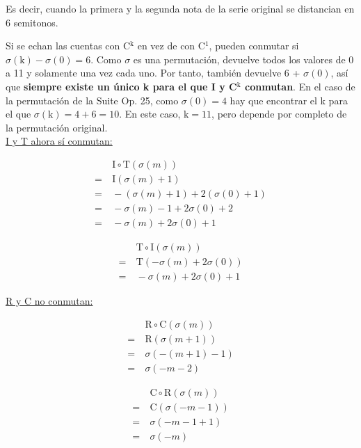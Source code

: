 		Es decir, cuando la primera y la segunda nota de la serie original se distancian en 6 semitonos.
		
		Si se echan las cuentas con C$^\text{k}$ en vez de con C$^1$, pueden conmutar si $\sigma\left(\text{k}\right)-\sigma\left(0\right)=6$. Como $\sigma$ es una permutación, devuelve todos los valores de 0 a 11 y solamente una vez cada uno. Por tanto, también devuelve 6 + $\sigma(0)$, así que \textbf{siempre existe un único k para el que I y C$^\text{k}$ conmutan}. En el caso de la permutación de la Suite Op. 25, como $\sigma\left(0\right)=4$ hay que encontrar el k para el que $\sigma\left(\text{k}\right)=4+6=10$. En este caso, $\text{k}=11$, pero depende por completo de la permutación original.\\
		
		\newpage
		 \underline{I y T ahora sí conmutan:}
		 \vspace*{-2\bigskipamount}
		\begin{multicols}{2}
			\begin{align*}
			&\ \text{I}\circ\text{T}(\sigma(m))\\
			=&\ \text{I}(\sigma(m)+1)\\
			=&\ -(\sigma(m)+1) + 2(\sigma(0)+1)\\
			=&\ -\sigma(m)-1+2\sigma(0)+2\\
			=&\ -\sigma(m)+2\sigma(0)+1
			\end{align*}
			
			\begin{align*}
			&\ \text{T}\circ\text{I}(\sigma(m))\\
			=&\ \text{T}(-\sigma(m)+2\sigma(0))\\
			=&\ -\sigma(m)+2\sigma(0)+1
			\end{align*}
		\end{multicols}
		
		 \underline{R y C no conmutan:}
		 \vspace*{-2\bigskipamount}
		\begin{multicols}{2}
		\begin{align*}
		&\ \text{R}\circ\text{C}(\sigma(m))\\
		=&\ \text{R}(\sigma(m+1))\\
		=&\ \sigma(-(m+1)-1)\\
		=&\ \sigma(-m-2)
		\end{align*}
		
		\begin{align*}
		&\ \text{C}\circ\text{R}(\sigma(m))\\
		=&\ \text{C}(\sigma(-m-1))\\
		=&\ \sigma(-m-1+1)\\
		=&\ \sigma(-m)
		\end{align*}
		\end{multicols}
		
